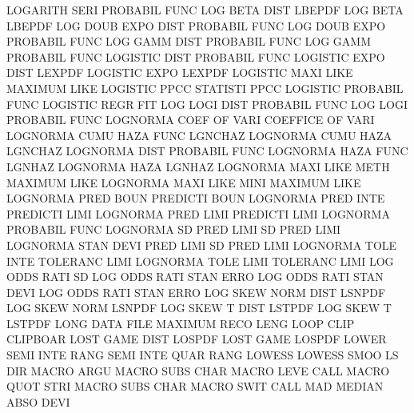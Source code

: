 LOGARITH SERI                           PROBABIL FUNC
LOG      BETA DIST                      LBEPDF
LOG      BETA                           LBEPDF
LOG      DOUB EXPO DIST                 PROBABIL FUNC
LOG      DOUB EXPO                      PROBABIL FUNC
LOG      GAMM DIST                      PROBABIL FUNC
LOG      GAMM                           PROBABIL FUNC
LOGISTIC DIST                           PROBABIL FUNC
LOGISTIC EXPO DIST                      LEXPDF
LOGISTIC EXPO                           LEXPDF
LOGISTIC MAXI LIKE                      MAXIMUM  LIKE
LOGISTIC PPCC                           STATISTI PPCC
LOGISTIC                                PROBABIL FUNC
LOGISTIC REGR                           FIT
LOG      LOGI DIST                      PROBABIL FUNC
LOG      LOGI                           PROBABIL FUNC
LOGNORMA COEF OF   VARI                 COEFFICE OF   VARI
LOGNORMA CUMU HAZA FUNC                 LGNCHAZ
LOGNORMA CUMU HAZA                      LGNCHAZ
LOGNORMA DIST                           PROBABIL FUNC
LOGNORMA HAZA FUNC                      LGNHAZ
LOGNORMA HAZA                           LGNHAZ
LOGNORMA MAXI LIKE METH                 MAXIMUM  LIKE
LOGNORMA MAXI LIKE MINI                 MAXIMUM  LIKE
LOGNORMA PRED BOUN                      PREDICTI BOUN
LOGNORMA PRED INTE                      PREDICTI LIMI
LOGNORMA PRED LIMI                      PREDICTI LIMI
LOGNORMA                                PROBABIL FUNC
LOGNORMA SD   PRED LIMI                 SD       PRED LIMI
LOGNORMA STAN DEVI PRED LIMI            SD       PRED LIMI
LOGNORMA TOLE INTE                      TOLERANC LIMI
LOGNORMA TOLE LIMI                      TOLERANC LIMI
LOG      ODDS RATI SD                   LOG      ODDS RATI STAN ERRO
LOG      ODDS RATI STAN DEVI            LOG      ODDS RATI STAN ERRO
LOG      SKEW NORM DIST                 LSNPDF
LOG      SKEW NORM                      LSNPDF
LOG      SKEW T    DIST                 LSTPDF
LOG      SKEW T                         LSTPDF
LONG     DATA FILE                      MAXIMUM  RECO LENG
LOOP     CLIP                           CLIPBOAR
LOST     GAME DIST                      LOSPDF
LOST     GAME                           LOSPDF
LOWER    SEMI INTE RANG                 SEMI     INTE QUAR RANG
LOWESS                                  LOWESS   SMOO
LS                                      DIR
MACRO    ARGU                           MACRO    SUBS CHAR
MACRO    LEVE                           CALL
MACRO    QUOT STRI                      MACRO    SUBS CHAR
MACRO    SWIT                           CALL
MAD                                     MEDIAN   ABSO DEVI
